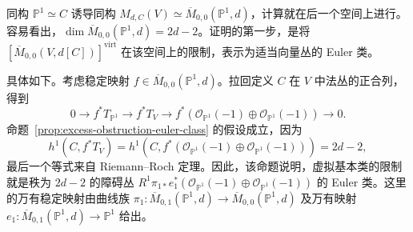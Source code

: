 同构 $\mathbb P^1\simeq C$ 诱导同构 $M_{d,C}(V)\simeq\overline M_{0,0}(\mathbb P^1,d)$，计算就在后一个空间上进行。容易看出，$\dim\overline M_{0,0}(\mathbb P^1,d)=2d-2$。证明的第一步，是将 $[\overline M_{0,0}(V,d[C])]^{\mathrm{virt}}$ 在该空间上的限制，表示为适当向量丛的 Euler 类。

具体如下。考虑稳定映射 $f\in\overline M_{0,0}(\mathbb P^1,d)$。拉回定义 $C$ 在 $V$ 中法丛的正合列，得到
\[
0\longrightarrow f^*T_{\mathbb P^1}\longrightarrow f^*T_V
\longrightarrow f^*(\mathcal O_{\mathbb P^1}(-1)\oplus\mathcal O_{\mathbb P^1}(-1))\longrightarrow0.
\]
命题~\ref{prop:excess-obstruction-euler-class} 的假设成立，因为
\[
h^1(C,f^*T_V)=h^1(C,f^*(\mathcal O_{\mathbb P^1}(-1)\oplus\mathcal O_{\mathbb P^1}(-1)))=2d-2,
\]
最后一个等式来自 Riemann--Roch 定理。因此，该命题说明，虚拟基本类的限制就是秩为 $2d-2$ 的障碍丛 $R^1\pi_{1*}e_1^*(\mathcal O_{\mathbb P^1}(-1)\oplus\mathcal O_{\mathbb P^1}(-1))$ 的 Euler 类。这里的万有稳定映射由曲线族 $\pi_1:\overline M_{0,1}(\mathbb P^1,d)\to\overline M_{0,0}(\mathbb P^1,d)$ 及万有映射 $e_1:\overline M_{0,1}(\mathbb P^1,d)\to\mathbb P^1$ 给出。

